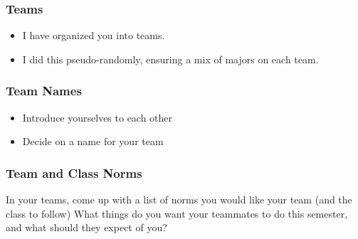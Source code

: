 \documentclass[aspectratio=1610]{beamer}
\begin{document}
\begin{frame}\frametitle{Teams}
\begin{itemize}
\item I have organized you into teams.
\item I did this pseudo-randomly, ensuring a mix of majors on each team.
\end{itemize}
\end{frame}



\begin{frame}\frametitle{Team Names}
\begin{itemize}
\item Introduce yourselves to each other
\item Decide on a name for your team
\end{itemize}
\end{frame}

%


\begin{frame}\frametitle{Team and Class Norms}

In your teams, come up with a list of norms you would like your team (and the class to follow)
\vfill
What things do you want your teammates to do this semester, and what should they expect of you?
\end{frame}
\end{document}
